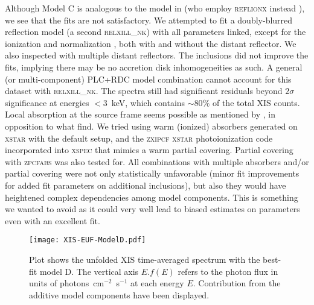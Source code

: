 \documentclass[aps,prd,twocolumn,superscriptaddress,nofootinbib,amsmath,amssymb]{revtex4-1}
\begin{document}
Although Model C is analogous to the model in \cite{W13} (who employ \textsc{reflionx} instead \citep{RF2005}), we see that the fits are not satisfactory. We attempted to fit a doubly-blurred reflection model (a second \textsc{relxill\_nk}) with all parameters linked, except for the ionization and normalization \citep{Cao2018,TripathiArk564}, both with and without the distant reflector. We also inspected with multiple distant reflectors. The inclusions did not improve the fits, implying there may be no accretion disk inhomogeneities as such. A general (or multi-component) PLC+RDC model combination cannot account for this dataset with \textsc{relxill\_nk}. The spectra still had significant residuals beyond $2\sigma$ significance at energies $<3$~keV, which contains $\sim80\%$ of the total XIS counts. Local absorption at the source frame seems possible as mentioned by \citep{Longinotti2013}, in opposition to what \cite{Patrick2011} find. We tried using warm (ionized) absorbers generated on \textsc{xstar} \citep{XSTAR} with the default setup, and the \textsc{zxipcf xstar} photoionization code incorporated into \textsc{xspec} that mimics a warm partial covering. Partial covering with \textsc{zpcfabs} was also tested for. All combinations with multiple absorbers and/or partial covering were not only statistically unfavorable (minor fit improvements for added fit parameters on additional inclusions), but also they would have heightened complex dependencies among model components. This is something we wanted to avoid as it could very well lead to biased estimates on parameters even with an excellent fit.

\begin{figure}[!h]
\centering
\texttt{[image: XIS-EUF-ModelD.pdf]}
\caption{Plot shows the unfolded XIS time-averaged spectrum with the best-fit model D. The vertical axis $E.f(E)$ refers to the photon flux in units of photons~cm$^{-2}$~s$^{-1}$ at each energy $E$. Contribution from the additive model components have been displayed.} \label{ModelDspec}
\end{figure}
\end{document}
